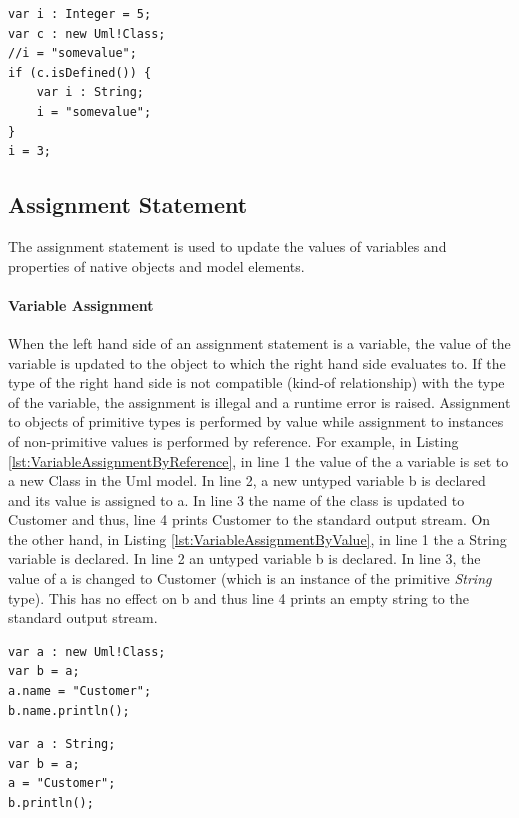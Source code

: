\begin{lstlisting}[float=tbp, caption=Example illustrating declaration and use of variables, label=lst:Variables, language=EOL]
var i : Integer = 5;
var c : new Uml!Class;
//i = "somevalue";
if (c.isDefined()) {
	var i : String;
	i = "somevalue";
}
i = 3;
\end{lstlisting}

\subsection{Assignment Statement}

The assignment statement is used to update the values of variables and  properties of native objects and model elements.

\paragraph{Variable Assignment}

When the left hand side of an assignment statement is a variable, the value of the variable is updated to the object to which the right hand side evaluates to. If the type of the right hand side is not compatible (kind-of relationship) with the type of the variable, the assignment is illegal and a runtime error is raised. Assignment to objects of primitive types is performed by value while assignment to instances of non-primitive values is performed by reference. For example, in Listing \ref{lst:VariableAssignmentByReference}, in line 1 the value
of the a variable is set to a new Class in the Uml model. In line 2, a new untyped variable b is declared and its value is assigned to a. In line 3 the name of the class is updated to Customer and thus, line 4 prints Customer to the standard output stream. On the other hand, in Listing \ref{lst:VariableAssignmentByValue}, in line 1 the a String variable is declared. In line 2 an untyped variable b is declared. In line 3, the value of a is changed to Customer (which is an instance of the primitive \emph{String} type). This has no effect on b and thus line 4 prints an empty string to the standard output stream.

\begin{lstlisting}[float=bp, caption=Assigning the value of a variable by reference, label=lst:VariableAssignmentByReference, language=EOL]
var a : new Uml!Class;
var b = a;
a.name = "Customer";
b.name.println();
\end{lstlisting}

\begin{lstlisting}[float=bp, caption=Assigning the value of a variable by value, label=lst:VariableAssignmentByValue, language=EOL]
var a : String;
var b = a;
a = "Customer";
b.println();
\end{lstlisting}

